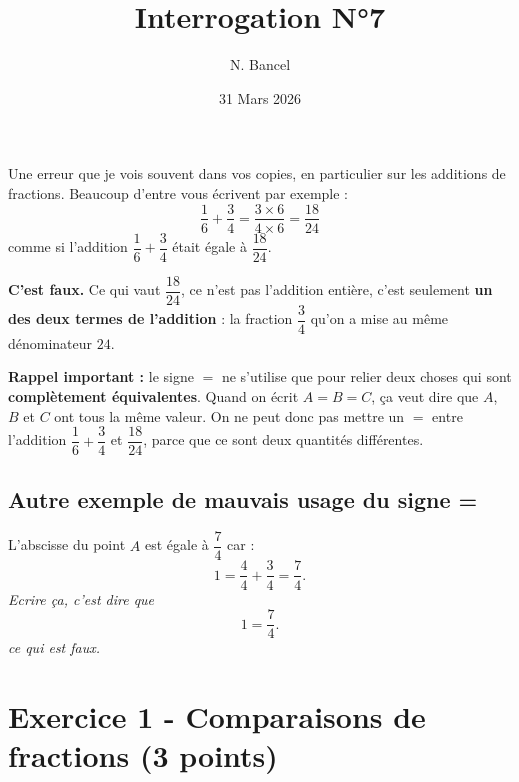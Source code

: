 \documentclass[answers]{exam}
\title{Interrogation N°7}
\author{N. Bancel}
\date{31 Mars 2026}
\begin{document}
{\let\newpage\relax\maketitle}
 \begin{Indication}
\end{Indication}

\begin{Erreur}
Une erreur que je vois souvent dans vos copies, en particulier sur les additions de fractions. Beaucoup d'entre vous écrivent par exemple :
\[
  \dfrac{1}{6} + \dfrac{3}{4} = \dfrac{3 \times 6}{4 \times 6} = \dfrac{18}{24}
\]
comme si l'addition $\dfrac{1}{6} + \dfrac{3}{4}$ était égale à $\dfrac{18}{24}$.

\textbf{C'est faux.} Ce qui vaut $\dfrac{18}{24}$, ce n'est pas l'addition entière, c'est seulement \textbf{un des deux termes de l'addition} : la fraction $\dfrac{3}{4}$ qu'on a mise au même dénominateur $24$.

\textbf{Rappel important :} le signe $=$ ne s'utilise que pour relier deux choses qui sont \textbf{complètement équivalentes}. Quand on écrit $A = B = C$, ça veut dire que $A$, $B$ et $C$ ont tous la même valeur. On ne peut donc pas mettre un $=$ entre l'addition $\dfrac{1}{6} + \dfrac{3}{4}$ et $\dfrac{18}{24}$, parce que ce sont deux quantités différentes.

\subsection{Autre exemple de mauvais usage du signe =}

L'abscisse du point $A$ est égale à $\dfrac{7}{4}$ car : 
\[
  1 = \frac{4}{4} + \frac{3}{4} = \frac{7}{4}.
\]
\textit{Ecrire ça, c'est dire que}
\[
  1 = \frac{7}{4}.
\]
\textit{ce qui est faux.}


\end{Erreur}

\section*{Exercice 1 - Comparaisons de fractions (3 points)}
\end{document}

